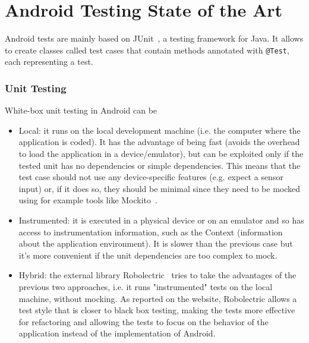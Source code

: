 \documentclass[11pt,a4paper,notitlepage]{article}
\begin{document}

\part{Android Testing State of the Art}

Android tests are mainly based on JUnit~\cite{JUnit}, a testing framework for Java. It allows to create classes called test cases that contain methods annotated with \texttt{@Test}, each representing a test.

\section{Unit Testing}
White-box unit testing in Android can be
\begin{itemize}
	\item Local: it runs on the local development machine (i.e. the computer where the application is coded). It has the advantage of being fast (avoids the overhead to load the application in a device/emulator), but can be exploited only if the tested unit has no dependencies or simple dependencies. This means that the test case should not use any device-specific features (e.g. expect a sensor input) or, if it does so, they should be minimal since they need to be mocked using for example tools like Mockito~\cite{Mockito}.
	\item Instrumented: it is executed in a physical device or on an emulator and so has access to instrumentation information, such as the Context (information about the application environment). It is slower than the previous case but it's more convenient if the unit dependencies are too complex to mock.
	\item Hybrid: the external library Robolectric~\cite{Robolectric} tries to take the advantages of the previous two approaches, i.e. it runs "instrumented" tests on the local machine, without mocking. As reported on the website, Robolectric allows a test style that is closer to black box testing, making the tests more effective for refactoring and allowing the tests to focus on the behavior of the application instead of the implementation of Android.
\end{itemize}
\end{document}
